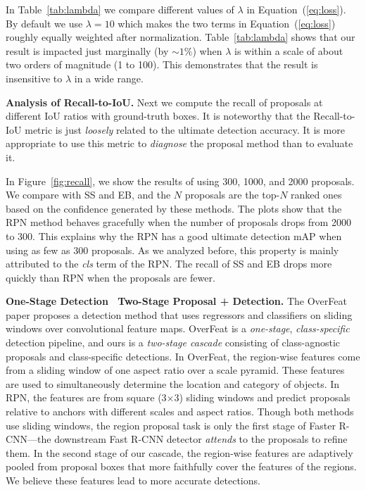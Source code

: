 \documentclass[10pt,journal,cspaper,compsoc]{IEEEtran}
\begin{document}
In Table~\ref{tab:lambda} we compare different values of $\lambda$ in Equation~(\ref{eq:loss}). By default we use $\lambda=10$ which makes the two terms in Equation~(\ref{eq:loss}) roughly equally weighted after normalization. Table~\ref{tab:lambda} shows that our result is impacted just marginally (by $\sim1\%$) when $\lambda$ is within a scale of about two orders of magnitude (1 to 100). This demonstrates that the result is insensitive to $\lambda$ in a wide range.

\vspace{.5em}
\noindent\textbf{Analysis of Recall-to-IoU.}
Next we compute the recall of proposals at different IoU ratios with ground-truth boxes. It is noteworthy that the Recall-to-IoU metric is just \emph{loosely} \cite{Hosang2014,Hosang2015,Chavali2015} related to the ultimate detection accuracy. It is more appropriate to use this metric to \emph{diagnose} the proposal method than to evaluate it.

In Figure~\ref{fig:recall}, we show the results of using 300, 1000, and 2000 proposals. We compare with SS and EB, and the $N$ proposals are the top-$N$ ranked ones based on the confidence generated by these methods.
The plots show that the RPN method behaves gracefully when the number of proposals drops from 2000 to 300. This explains why the RPN has a good ultimate detection mAP when using as few as 300 proposals. As we analyzed before, this property is mainly attributed to the \emph{cls} term of the RPN. The recall of SS and EB drops more quickly than RPN when the proposals are fewer.



\vspace{.5em}
\noindent\textbf{One-Stage Detection \vs~Two-Stage Proposal + Detection.}
The OverFeat paper \cite{Sermanet2014} proposes a detection method that uses regressors and classifiers on sliding windows over convolutional feature maps. OverFeat is a \emph{one-stage}, \emph{class-specific} detection pipeline, and ours is a \emph{two-stage cascade} consisting of class-agnostic proposals and class-specific detections. In OverFeat, the region-wise features come from a sliding window of one aspect ratio over a scale pyramid. These features are used to simultaneously determine the location and category of objects. In RPN, the features are from square (3$\times$3) sliding windows and predict proposals relative to anchors with different scales and aspect ratios. Though both methods use sliding windows, the region proposal task is only the first stage of Faster R-CNN---the downstream Fast R-CNN detector \emph{attends} to the proposals to refine them. In the second stage of our cascade, the region-wise features are adaptively pooled \cite{He2014,Girshick2015a} from proposal boxes that more faithfully cover the features of the regions. We believe these features lead to more accurate detections.
\end{document}
